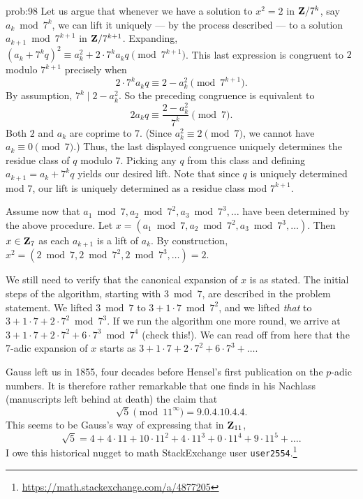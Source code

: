 \begin{sol}{prob:98} Let us argue that whenever we have a solution to $x^2=2$ in $\mathbf{Z}/7^k$, say $a_k\bmod{7^k}$, we can lift it uniquely --- by the process described --- to a solution $a_{k+1}\bmod{7^{k+1}}$ in $\mathbf{Z}/7^{k+1}$. Expanding, $(a_k + 7^k q)^2 \equiv a_k^2 + 2\cdot 7^{k} a_k q \pmod{7^{k+1}}$. This last expression is congruent to $2$ modulo $7^{k+1}$ precisely when
\[ 2\cdot 7^k a_k q\equiv 2-a_k^2\pmod{7^{k+1}}. \]
By assumption, $7^k \mid 2-a_k^2$. So the preceding congruence is equivalent to
\[ 2a_k q \equiv \frac{2-a_k^2}{7^k} \pmod{7}.\]
Both $2$ and $a_k$ are coprime to $7$. (Since $a_k^2\equiv 2\pmod{7}$,  we cannot have $a_k\equiv 0\pmod{7}$.) Thus, the last displayed congruence uniquely determines the residue class of $q$ modulo $7$. Picking any $q$ from this class and defining $a_{k+1}=a_k + 7^k q$ yields our desired lift. Note that since $q$ is uniquely determined mod $7$, our lift is uniquely determined as a residue class mod $7^{k+1}$.

Assume now that $a_1\bmod{7}, a_2\bmod{7^2}, a_3\bmod{7^3},\dots$ have been determined by the above procedure. Let $x = (a_1\bmod{7}, a_2\bmod{7^2}, a_3\bmod{7^3},\dots)$. Then $x\in \mathbf{Z}_7$ as each $a_{k+1}$ is a lift of $a_k$. By construction, $x^2 = (2\bmod{7},2\bmod{7^2},2\bmod{7^3},\dots) = 2$.

We still need to verify that the canonical expansion of $x$ is as stated. The initial steps of the algorithm, starting with $3\bmod{7}$, are described in the problem statement. We lifted $3\bmod{7}$ to $3+1\cdot 7\bmod{7^2}$, and we lifted \emph{that} to $3+1\cdot 7 + 2\cdot 7^2 \bmod{7^3}$. If we run the algorithm one more round, we arrive at $3+1\cdot 7 + 2\cdot 7^2 + 6\cdot 7^3\bmod{7^4}$ (check this!). We can read off from here that the $7$-adic expansion of $x$ starts as 
$3+1\cdot 7 + 2\cdot 7^2 + 6\cdot 7^3 + \dots$. 

\begin{rmk} Gauss left us in 1855, four decades before Hensel's first publication on the $p$-adic numbers. It is therefore rather remarkable that one finds in his Nachlass (manuscripts left behind at death) the claim that
\[  \sqrt{5} \pmod{11^{\infty}} = 9.0.4.10.4.4.\]
This seems to be Gauss's way of expressing that in $\mathbf{Z}_{11}$,
\[ \sqrt{5} = 4 + 4\cdot 11 + 10 \cdot 11^2 + 4\cdot 11^3 + 0\cdot 11^4 + 9\cdot 11^5+\dots.\]
I owe this historical nugget to math StackExchange user \texttt{user2554}.\footnote{\url{https://math.stackexchange.com/a/4877205}}
\end{rmk}
\end{sol}




